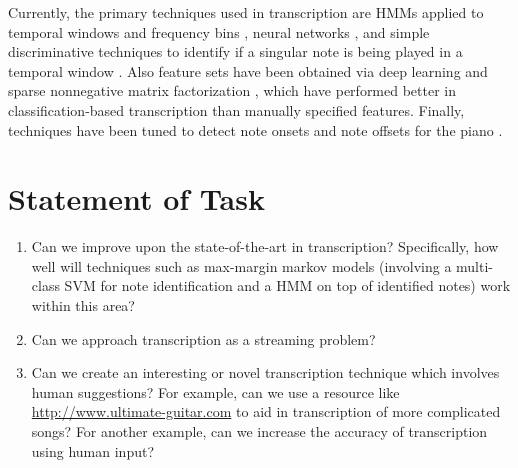 \documentclass{article}
\begin{document}
Currently, the primary techniques used in transcription are HMMs applied to
temporal windows and frequency bins \cite{raphael2002automatic}, neural
networks \cite{bock2012polyphonic}, and simple
discriminative techniques to identify if a singular note is being played in
a temporal window \cite{poliner2006discriminative}. Also feature sets have
been obtained via deep learning \cite{nam2011classification} and sparse
nonnegative matrix factorization \cite{costantini2013nmf}, which have performed
better in classification-based transcription than manually specified features.
Finally, techniques have been tuned to detect note onsets and note offsets for
the piano \cite{5946322}.


\section{Statement of Task}
\begin{enumerate}
\item
Can we improve upon the state-of-the-art in transcription? Specifically,
how well will techniques such as max-margin markov models (involving a
multi-class SVM for note identification and a HMM on top of identified notes)
work within this area?
\item
Can we approach transcription as a streaming problem?
\item
Can we create an interesting or novel transcription technique which
involves human suggestions? For example, can we use a resource like
\url{http://www.ultimate-guitar.com} to aid in transcription of more
complicated songs? For another example, can we increase the accuracy of
transcription using human input?
\end{enumerate}
\end{document}
